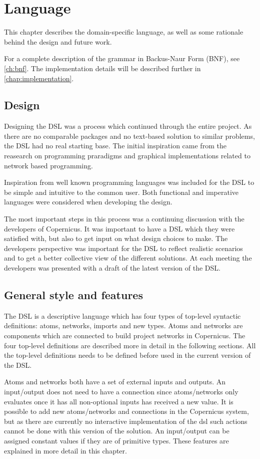 \chapter{Language}\label{chap:language}
This chapter describes the domain-specific language, as well as some
rationale behind the design and future work.

For a complete description of the grammar in Backus-Naur Form (BNF),
see \autoref{ch:bnf}. The implementation details will be described
further in \autoref{chap:implementation}.

\section{Design}
Designing the DSL was a process which continued through the entire
project. As there are no comparable packages and no text-based
solution to similar problems, the DSL had no real starting base. The
initial inspiration came from the reasearch on programming praradigms
and graphical implementations related to network based programming.

Inspiration from well known programming languages was included for the
DSL to be simple and intuitive to the common user. Both functional and
imperative languages were considered when developing the design.

The most important steps in this process was a continuing discussion
with the developers of Copernicus. It was important to have a DSL
which they were satisfied with, but also to get input on what design
choices to make. The developers perspective was important for the DSL
to reflect realistic scenarios and to get a better collective view of
the different solutions. At each meeting the developers was presented
with a draft of the latest version of the DSL.

\section{General style and features}
The DSL is a descriptive language which has four types of top-level
syntactic definitions: atoms, networks, imports and new types. Atoms
and networks are components which are connected to build project
networks in Copernicus. The four top-level definitions are described
more in detail in the following sections. All the top-level
definitions needs to be defined before used in the current version of
the DSL.

Atoms and networks both have a set of external inputs and outputs. An
input/output does not need to have a connection since atoms/networks
only evaluates once it has all non-optional inputs has received a new
value. It is possible to add new atoms/networks and connections in the
Copernicus system, but as there are currently no interactive
implementation of the dsl such actions cannot be done with this
version of the solution. An input/output can be assigned constant
values if they are of primitive types. These features are explained in
more detail in this chapter.


